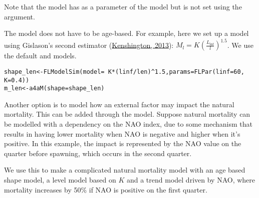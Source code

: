 \documentclass[a4paper,english,10pt]{article}\usepackage[]{graphicx}\usepackage[]{color}
\makeatletter
\newcommand{\hlnum}[1]{\textcolor[rgb]{0.063,0.58,0.627}{#1}}%
\newcommand{\hlopt}[1]{\textcolor[rgb]{0.196,0.196,0.196}{#1}}%
\newcommand{\hlstd}[1]{\textcolor[rgb]{0.196,0.196,0.196}{#1}}%
\newcommand{\hlkwb}[1]{\textcolor[rgb]{0.627,0,0.314}{#1}}%
\newcommand{\hlkwc}[1]{\textcolor[rgb]{0,0.631,0.314}{#1}}%
\newcommand{\hlkwd}[1]{\textcolor[rgb]{0.78,0.227,0.412}{#1}}%
\newenvironment{kframe}{%
 \def\at@end@of@kframe{}%
 \ifinner\ifhmode%
  \def\at@end@of@kframe{\end{minipage}}%
  \begin{minipage}{\columnwidth}%
 \fi\fi%
 \def\FrameCommand##1{\hskip\@totalleftmargin \hskip-\fboxsep
 \colorbox{shadecolor}{##1}\hskip-\fboxsep
     \hskip-\linewidth \hskip-\@totalleftmargin \hskip\columnwidth}%
 \MakeFramed {\advance\hsize-\width
   \@totalleftmargin\z@ \linewidth\hsize
   \@setminipage}}%
 {\par\unskip\endMakeFramed%
 \at@end@of@kframe}
\newenvironment{knitrout}{}{} %
\makeatother
\begin{document}
Note that the  model has  as a parameter of the model but is not set using the  argument.

The  model does not have to be age-based. For example, here we set up a  model using Gislason's second estimator (\href{}{Kenshington, 2013}):
$M_l=K(\frac{L_{\inf}}{l})^{1.5}$. We use the default  and  models.

\begin{knitrout}
\color{fgcolor}\begin{kframe}
\begin{alltt}
\hlstd{shape_len} \hlkwb{<-} \hlkwd{FLModelSim}\hlstd{(}\hlkwc{model} \hlstd{=} \hlopt{~}\hlstd{K} \hlopt{*} \hlstd{(linf}\hlopt{/}\hlstd{len)}\hlopt{^}\hlnum{1.5}\hlstd{,} \hlkwc{params} \hlstd{=} \hlkwd{FLPar}\hlstd{(}\hlkwc{linf} \hlstd{=} \hlnum{60}\hlstd{,}
    \hlkwc{K} \hlstd{=} \hlnum{0.4}\hlstd{))}
\hlstd{m_len} \hlkwb{<-} \hlkwd{a4aM}\hlstd{(}\hlkwc{shape} \hlstd{= shape_len)}
\end{alltt}
\end{kframe}
\end{knitrout}

Another option is to model how an external factor may impact the natural mortality. This can be added through the  model. Suppose natural mortality can be modelled with a dependency on the NAO index, due to some mechanism that results in having lower mortality when NAO is negative and higher when it's positive. In this example, the impact is represented by the NAO value on the quarter before spawning, which occurs in the second quarter. 

We use this to make a complicated natural mortality model with an age based shape model, a level model based on $K$ and a trend model driven by NAO, where mortality increases by 50\% if NAO is positive on the first quarter.
\end{document}

